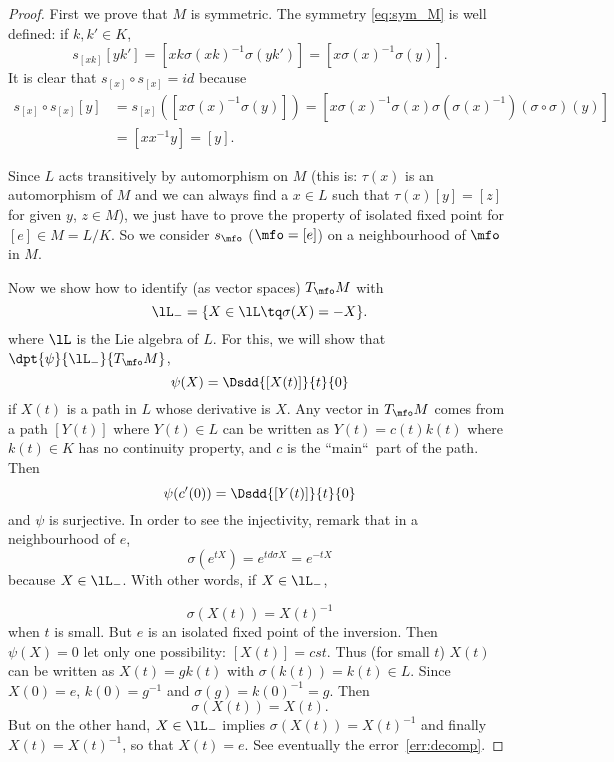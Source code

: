 \begin{proof}
  First we prove that $M$ is symmetric. The symmetry \eqref{eq:sym_M} is well defined: if $k,k'\in K$,
  \begin{equation}
  s_{[xk]}[yk']=[xk\sigma(xk)^{-1}\sigma(yk')]
               =[x\sigma(x)^{-1}\sigma(y)].
\end{equation}
 It is clear that $s_{[x]}\circ s_{[x]}=id$ because
\begin{equation}
\begin{split}
  s_{[x]}\circ s_{[x]}[y]&=s_{[x]}([ x\sigma(x)^{-1}\sigma(y) ])
                         =[x\sigma(x)^{-1}\sigma(x)\sigma(\sigma(x)^{-1})(\sigma\circ\sigma)(y)]\\
			 &=[xx^{-1} y]
			 =[y].
\end{split}
\end{equation}

Since $L$ acts transitively by automorphism on $M$ (this is: $\tau(x)$ is an automorphism of $M$ and we can always find a $x\in L$ such that $\tau(x)[y]=[z]$ for given $y$, $z\in M$), we just have to prove the property of isolated fixed point for $[e]\in M=L/K$. So we consider $s_{\mfo}$ ($\mfo=[e]$) on a neighbourhood of $\mfo$ in $M$.

Now we show how to identify (as vector spaces) $T_{\mfo}M$ with
\[
   \lL_-=\{X\in\lL\tq \sigma(X)=-X\}.
\]
where $\lL$ is the Lie algebra of $L$. For this, we will show that $\dpt{\psi}{\lL_-}{T_{\mfo}M}$,
\begin{equation}
  \psi(X)=\Dsdd{[X(t)]}{t}{0}
\end{equation}
if $X(t)$ is a path in $L$ whose derivative is $X$. Any vector in $T_{\mfo}M$ comes from a path $[Y(t)]$ where $Y(t)\in L$ can be written as $Y(t)=c(t)k(t)$ where $k(t)\in K$ has no continuity property, and $c$ is the ``main``\ part of the path. Then
\[
  \psi(c'(0))=\Dsdd{ [Y(t)] }{t}{0}
\]
and $\psi$ is surjective. In order to see the injectivity, remark that in a neighbourhood of $e$,
\[
   \sigma(e^{tX})=e^{td\sigma X}=e^{-tX}
\]
because $X\in\lL_-$. With other words, if $X\in\lL_-$,

 \[
    \sigma(X(t))=X(t)^{-1}
 \]
when $t$ is small. But $e$ is an isolated fixed point of the inversion. Then $\psi(X)=0$ let only one possibility: $[X(t)]=cst$. Thus (for small $t$) $X(t)$ can be written as $X(t)=gk(t)$ with $\sigma(k(t))=k(t)\in L$. Since $X(0)=e$, $k(0)=g^{-1}$ and $\sigma(g)=k(0)^{-1}=g$. Then
 \[
   \sigma(X(t))=X(t).
 \]
But on the other hand, $X\in\lL_-$ implies $\sigma(X(t))=X(t)^{-1}$ and finally $X(t)=X(t)^{-1}$, so that $X(t)=e$. See eventually the error~\ref{err:decomp}\label{pg:X_t}.


\end{proof}
